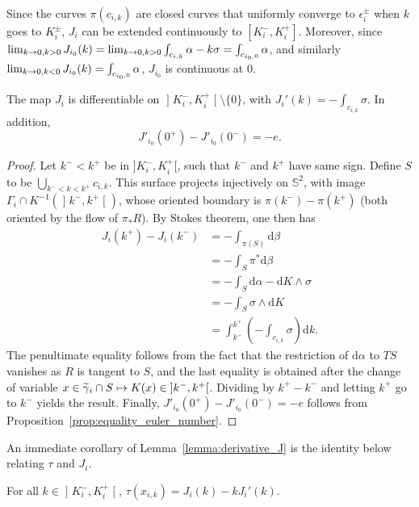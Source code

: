 \documentclass[AHL,Unicode,longabstracts]{cedram}
\newcommand{\bbS}{\mathbb{S}}
\newcommand{\rmd}{\mathrm{d}}
\renewcommand*{\to}{\mathchoice{\longrightarrow}{\rightarrow}{\rightarrow}{\rightarrow}}
\let\oldmapsto\mapsto
\renewcommand*{\mapsto}{\mathchoice{\longmapsto}{\oldmapsto}{\oldmapsto}{\oldmapsto}}
\let\oldtilde\tilde
\renewcommand*{\tilde}[1]{\mathchoice{\widetilde{#1}}{\widetilde{#1}}{\oldtilde{#1}}{\oldtilde{#1}}}
\newcommand{\bbS}{\mathbb{S}}
\begin{document}
Since the curves $\pi(c_{i,k})$ are closed curves that uniformly converge to $\epsilon_i^\pm$ when $k$ goes to $K_i^\pm$, $J_i$ can be extended continuously to $[K^-_i, K^+_i]$. Moreover, since $\lim_{k \to 0, k >  0} J_{i_0}(k)= \lim_{k \to 0, k > 0} \int_{c_{i,k}} \alpha - k \sigma = \int_{c_{i_0,0}} \alpha$, and similarly $\lim_{k \to 0, k < 0} J_{i_0}(k) = \int_{c_{i_0,0}} \alpha$, $J_{i_0}$ is continuous at $0$.

\begin{lemm}\label{lemma:derivative_J} 
The map $J_i$ is differentiable on $\mathopen{]}K_i^-, K_i^+\mathclose{[}\setminus \{0\}$, with $J_i'(k) = -\int_{c_{i,k}} \sigma$. In addition,
\[
J'_{i_0}(0^+)-J'_{i_0}(0^-) = -e.
\]
\end{lemm}

\begin{proof}
Let $k^- < k^+$ be in $]K_i^-, K_i^+[$, such that $k^-$ and $k^+$ have same sign. Define $S$ to be $\bigcup_{k^- < k < k^+}c_{i,k}$. This surface projects injectively on $\bbS^2$, with image\pagebreak{} $\Gamma_i \cap K^{-1}(\mathopen{]}k^-,k^+\mathclose{[})$, whose oriented boundary is $\pi(k^-) - \pi(k^+)$ (both oriented by the flow of $\pi_* R$). By Stokes theorem, one then has
\begin{align*}
J_i(k^+)-J_i(k^-) &= -\int_{\pi(S)} \rmd \beta \\
&= -\int_{S} \pi^*\rmd \beta \\
&= -\int_{S} \rmd \alpha - \rmd K \wedge \sigma \\
&= -\int_{S} \sigma \wedge \rmd K \\
&= \int_{k^-}^{k^+}\left(-\int_{c_{i,k}} \sigma \right) \rmd k.
\end{align*}
The penultimate equality follows from the fact that the restriction of $\rmd  \alpha$ to $TS$ vanishes as $R$ is tangent to $S$, and the last equality is obtained after the change of variable $x \in \tilde \gamma_i \cap S \mapsto K(x) \in\mathopen{]}k^-, k^+\mathclose{[}$. Dividing by $k^+ - k^-$ and letting $k^+$ go to $k^-$ yields the result. Finally, $J'_{i_0}(0^+)-J'_{i_0}(0^-) = -e$ follows from Proposition~\ref{prop:equality_euler_number}.
\end{proof}

An immediate corollary of Lemma~\ref{lemma:derivative_J} is the identity below relating $\tau$ and $J_i$.

\begin{coro}\label{coro:identity_tau}
For all $k \in\mathopen{]}K_i^-, K_i^+\mathclose{[}$, $\tau(x_{i,k}) = J_i(k) - k J_i'(k)$.
\end{coro}
\end{document}
